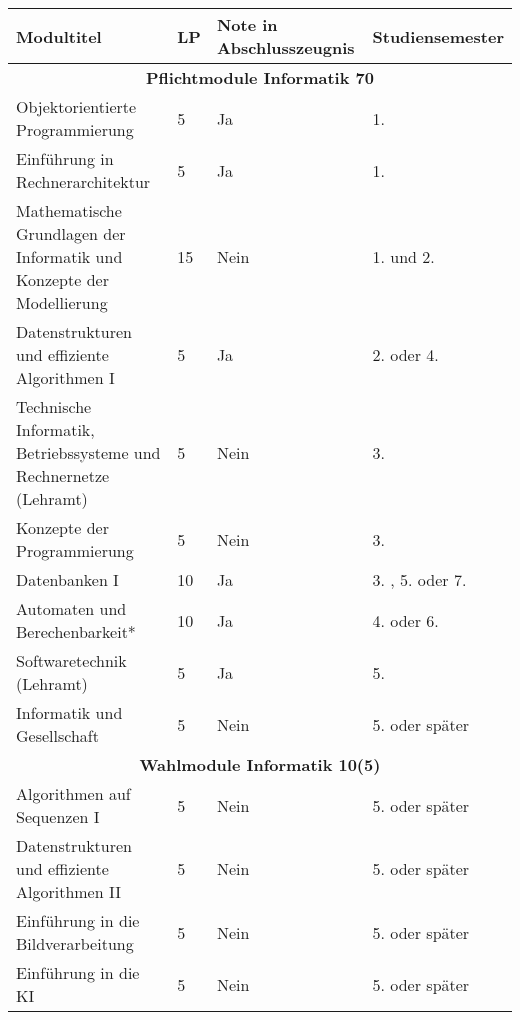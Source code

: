 \begin{table}[tbp]
    \begin{footnotesize}
    \begin{tabularx}{\textwidth}{|b{}|X|X|X|}
        \hline
        Modultitel                                                            & LP & Note in Abschlusszeugnis & Studien\-semester \\
        \hline
        \multicolumn{4}{|c|}{\textbf{Pflichtmodule Informatik 70}}\\\hline
        Objektorientierte Programmierung                                      &  5 & Ja   & 1. \\
        Einführung in Rechnerarchitektur                                      &  5 & Ja   & 1. \\
        Mathematische Grundlagen der Informatik und Konzepte der Modellierung & 15 & Nein & 1. und 2. \\
        Datenstrukturen und effiziente Algorithmen I                          &  5 & Ja   & 2. oder 4. \\
        Technische Informatik, Betriebssysteme und Rechnernetze (Lehramt)     &  5 & Nein & 3. \\
        Konzepte der Programmierung                                           &  5 & Nein & 3. \\
        Datenbanken I                                                         & 10 & Ja   & 3. , 5. oder 7. \\
        Automaten und Berechenbarkeit*                                        & 10 & Ja   & 4. oder 6. \\
        Softwaretechnik (Lehramt)                                             &  5 & Ja   & 5. \\
        Informatik und Gesellschaft                                           &  5 & Nein & 5. oder später \\
        \hline
        \multicolumn{4}{|c|}{\textbf{Wahlmodule Informatik 10(5)}}\\\hline
        Algorithmen auf Sequenzen I                      & 5 & Nein & 5. oder später \\
        Datenstrukturen und effiziente Algorithmen II    & 5 & Nein & 5. oder später \\
        Einführung in die Bildverarbeitung               & 5 & Nein & 5. oder später \\
        Einführung in die KI                             & 5 & Nein & 5. oder später \\

\end{tabularx}
\end{footnotesize}
\end{table}
